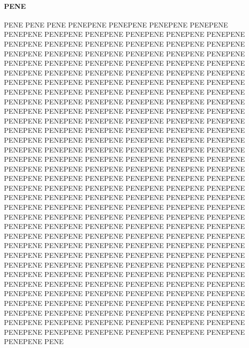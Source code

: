 \paragraph{PENE}
PENE PENE PENE PENEPENE PENEPENE PENEPENE PENEPENE PENEPENE PENEPENE PENEPENE PENEPENE PENEPENE PENEPENE PENEPENE PENEPENE PENEPENE PENEPENE PENEPENE PENEPENE PENEPENE PENEPENE PENEPENE PENEPENE PENEPENE PENEPENE PENEPENE PENEPENE PENEPENE PENEPENE PENEPENE PENEPENE PENEPENE PENEPENE PENEPENE PENEPENE PENEPENE PENEPENE PENEPENE PENEPENE PENEPENE PENEPENE PENEPENE PENEPENE PENEPENE PENEPENE PENEPENE PENEPENE PENEPENE PENEPENE PENEPENE PENEPENE PENEPENE PENEPENE PENEPENE PENEPENE PENEPENE PENEPENE PENEPENE PENEPENE PENEPENE PENEPENE PENEPENE PENEPENE PENEPENE PENEPENE PENEPENE PENEPENE PENEPENE PENEPENE PENEPENE PENEPENE PENEPENE PENEPENE PENEPENE PENEPENE PENEPENE PENEPENE PENEPENE PENEPENE PENEPENE PENEPENE PENEPENE PENEPENE PENEPENE PENEPENE PENEPENE PENEPENE PENEPENE PENEPENE PENEPENE PENEPENE PENEPENE PENEPENE PENEPENE PENEPENE PENEPENE PENEPENE PENEPENE PENEPENE PENEPENE PENEPENE PENEPENE PENEPENE PENEPENE PENEPENE PENEPENE PENEPENE PENEPENE PENEPENE PENEPENE PENEPENE PENEPENE PENEPENE PENEPENE PENEPENE PENEPENE PENEPENE PENEPENE PENEPENE PENEPENE PENEPENE PENEPENE PENEPENE PENEPENE PENEPENE PENEPENE PENEPENE PENEPENE PENEPENE PENEPENE PENEPENE PENEPENE PENEPENE PENEPENE PENEPENE PENEPENE PENEPENE PENEPENE PENEPENE PENEPENE PENEPENE PENEPENE PENEPENE PENEPENE PENEPENE PENEPENE PENEPENE PENEPENE PENEPENE PENEPENE PENEPENE PENEPENE PENEPENE PENEPENE PENEPENE PENEPENE PENEPENE PENEPENE PENEPENE PENEPENE PENEPENE PENEPENE PENEPENE PENEPENE PENEPENE PENEPENE PENEPENE PENEPENE PENEPENE PENEPENE PENEPENE PENEPENE PENEPENE PENEPENE PENEPENE PENEPENE PENEPENE PENEPENE PENEPENE PENEPENE PENEPENE PENEPENE PENEPENE PENEPENE PENEPENE PENEPENE PENEPENE PENEPENE PENEPENE PENEPENE PENEPENE PENEPENE PENEPENE PENEPENE PENEPENE PENEPENE PENEPENE PENEPENE PENEPENE PENEPENE PENE
